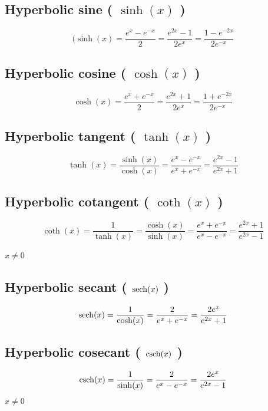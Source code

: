 \subsection{Hyperbolic sine ( $\sinh(x)$ ) }\label{Hyperbolic sine (sinh)}
\[
    (\sinh(x) = {\displaystyle\dfrac{e^{x} - e^{-x}}{2}}={\displaystyle\dfrac{e^{2x} - 1}{2e^{x}}}={\displaystyle\dfrac{1 - e^{-2x}}{2e^{-x}}}
\]

\subsection{Hyperbolic cosine ( $\cosh(x)$ ) }\label{Hyperbolic cosine (cosh)}
\[
    \cosh(x) = {\displaystyle\dfrac{e^{x} + e^{-x}}{2}} = {\displaystyle\dfrac{e^{2x} + 1}{2e^{x}}} = {\displaystyle\dfrac{1 + e^{-2x}}{2e^{-x}}}
\]

\subsection{Hyperbolic tangent ( $\tanh(x)$ )}\label{Hyperbolic tangent (tanh)}
\[
    \tanh(x) = \displaystyle\dfrac{\sinh(x)}{\cosh(x)} = \displaystyle\dfrac{e^{x} - e^{-x}}{e^{x} + e^{-x}} = \displaystyle\dfrac{e^{2x} - 1}{e^{2x} + 1}
\]

\subsection{Hyperbolic cotangent ( $\coth(x)$ )}\label{Hyperbolic cotangent (coth)}
\[
    \coth(x) = \displaystyle\dfrac{1}{\tanh(x)} = \displaystyle\dfrac{\cosh(x)}{\sinh(x)} = \displaystyle\dfrac{e^{x} + e^{-x}}{e^{x} - e^{-x}} = \displaystyle\dfrac{e^{2x} + 1}{e^{2x} - 1}
\]

$x \neq 0$

\subsection{Hyperbolic secant ( $\operatorname{sech}(x)$ )} \label{Hyperbolic secant (sech)}
\[
    \operatorname{sech}(x) = \displaystyle\dfrac{1}{\cosh(x)} = \displaystyle\dfrac{2}{e^{x} + e^{-x}} = \displaystyle\dfrac{2e^{x}}{e^{2x} + 1}
\]

\subsection{Hyperbolic cosecant ( $\operatorname{csch}(x)$ )}\label{Hyperbolic cosecant (csch)}
\[
    \operatorname{csch}(x) = \displaystyle\dfrac{1}{\sinh(x)} = \displaystyle\dfrac{2}{e^{x} - e^{-x}} = \displaystyle\dfrac{2e^{x}}{e^{2x} - 1}
\]
$x \neq 0$

